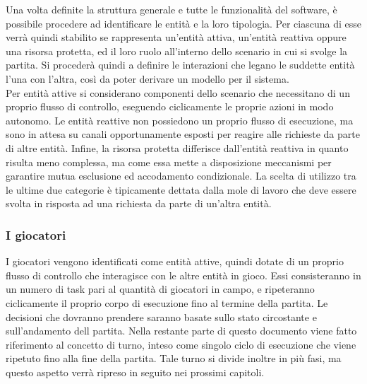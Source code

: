 Una volta definite la struttura generale e tutte le funzionalità del software, è possibile procedere ad identificare le entità e la loro tipologia. Per ciascuna di esse verrà quindi stabilito se rappresenta un'entità attiva, un'entità reattiva oppure una risorsa protetta, ed il loro ruolo all'interno dello scenario in cui si svolge la partita. Si procederà quindi a definire le interazioni che legano le suddette entità l'una con l'altra, così da poter derivare un modello per il sistema.\\

Per entità attive si considerano componenti dello scenario che necessitano di un proprio flusso di controllo, eseguendo ciclicamente le proprie azioni in modo autonomo. Le entità reattive non possiedono un proprio flusso di esecuzione, ma sono in attesa su canali opportunamente esposti per reagire alle richieste da parte di altre entità. Infine, la risorsa protetta differisce dall'entità reattiva in quanto risulta meno complessa, ma come essa mette a disposizione meccanismi per garantire mutua esclusione ed accodamento condizionale. La scelta di utilizzo tra le ultime due categorie è tipicamente dettata dalla mole di lavoro che deve essere svolta in risposta ad una richiesta da parte di un'altra entità.

\subsubsection{I giocatori}
\label{sec:entita_coinvolte_giocatori}

I giocatori vengono identificati come entità attive, quindi dotate di un proprio flusso di controllo che interagisce con le altre entità in gioco. Essi consisteranno in un numero di task pari al quantità di giocatori in campo, e ripeteranno ciclicamente il proprio corpo di esecuzione fino al termine della partita. Le decisioni che dovranno prendere saranno basate sullo stato circostante e sull'andamento dell partita. Nella restante parte di questo documento viene fatto riferimento al concetto di turno, inteso come singolo ciclo di esecuzione che viene ripetuto fino alla fine della partita. Tale turno si divide inoltre in più fasi, ma questo aspetto verrà ripreso in seguito nei prossimi capitoli.

%

